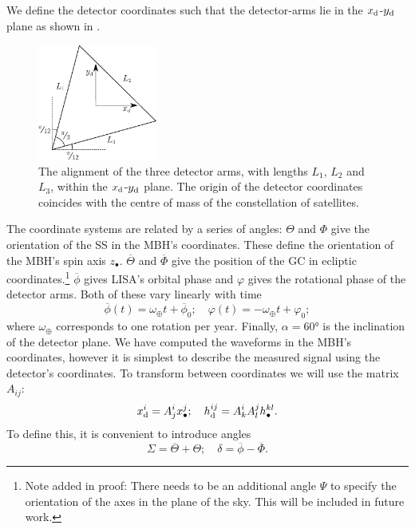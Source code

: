 We define the detector coordinates such that the detector-arms lie in the $x_\mathrm{d}$-$y_\mathrm{d}$ plane as shown in .
\begin{figure}[htb]
\begin{center}
\includegraphics[width=0.35\textwidth]{./Images/LISA_arms.eps}
    \caption{The alignment of the three detector arms, with lengths $L_1$, $L_2$ and $L_3$, within the $x_\mathrm{d}$-$y_\mathrm{d}$ plane\cite{Cutler1998}. The origin of the detector coordinates coincides with the centre of mass of the constellation of satellites.}
   \label{fig:LISA_arms}
\end{center}
\end{figure}
The coordinate systems are related by a series of angles: $\Theta$ and $\Phi$ give the orientation of the SS in the MBH's coordinates. These define the orientation of the MBH's spin axis $z_\bullet$. $\overline{\Theta}$ and $\overline{\Phi}$ give the position of the GC in ecliptic coordinates.\footnote{Note added in proof: There needs to be an additional angle $\Psi$ to specify the orientation of the axes in the plane of the sky. This will be included in future work.} $\overline{\phi}$ gives LISA's orbital phase and $\varphi$ gives the rotational phase of the detector arms. Both of these vary linearly with time
\begin{equation}
\overline{\phi}(t) = \omega_\oplus t + \overline{\phi}_0; \quad \varphi(t) = -\omega_\oplus t + \varphi_0;
\end{equation}
where $\omega_\oplus$ corresponds to one rotation per year. Finally, $\alpha = \ang{60}$ is the inclination of the detector plane. We have computed the waveforms in the MBH's coordinates, however it is simplest to describe the measured signal using the detector's coordinates. To transform between coordinates we will use the matrix $A_{ij}$:
\begin{equation}
x_\mathrm{d}^i = A^i_jx_\bullet^j; \quad h_\mathrm{d}^{ij} = A^i_kA^j_lh_\bullet^{kl}.
\end{equation}
To define this, it is convenient to introduce angles
\begin{equation}
\Sigma = \overline{\Theta} + \Theta; \quad \delta = \overline{\phi} - \overline{\Phi}.
\end{equation}
